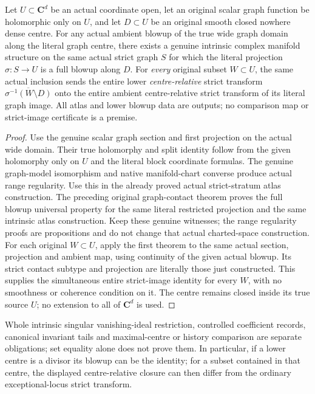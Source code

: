\begin{theorem}
\label{hir:actual-open-graph-every-subset-strict-transform}
\leanok
Let $U\subset\mathbf C^d$ be an actual coordinate open, let an original
scalar graph function be holomorphic only on $U$, and let $D\subset U$
be an original smooth closed nowhere dense centre. For any actual ambient
blowup of the true wide graph domain along the literal graph centre,
there exists a genuine intrinsic complex manifold structure on the same
actual strict graph $S$ for which the literal projection $\sigma:S\to U$
is a full blowup along $D$. For \emph{every} original subset $W\subset U$,
the same actual inclusion sends the entire lower \emph{centre-relative}
strict transform $\overline{\sigma^{-1}(W\setminus D)}$ onto the entire
ambient centre-relative strict transform of its literal graph image.
All atlas and lower blowup data are outputs; no comparison map or
strict-image certificate is a premise.
\end{theorem}
\begin{proof}
Use the genuine scalar graph section and first projection on the actual
wide domain. Their true holomorphy and split identity follow from the
given holomorphy only on $U$ and the literal block coordinate formulas.
The genuine graph-model isomorphism and native manifold-chart converse
produce actual range regularity. Use this in the already proved actual
strict-stratum atlas construction. The preceding original graph-contact
theorem proves the full blowup universal property for the same literal
restricted projection and the same intrinsic atlas construction. Keep
these genuine witnesses; the range regularity proofs are propositions
and do not change that actual charted-space construction.
For each original $W\subset U$, apply the first theorem to the same
actual section, projection and ambient map, using continuity of the
given actual blowup. Its strict contact subtype and projection are
literally those just constructed. This supplies the simultaneous entire
strict-image identity for every $W$, with no smoothness or coherence
condition on it. The centre remains closed inside its true source $U$;
no extension to all of $\mathbf C^d$ is used.
\end{proof}

Whole intrinsic singular vanishing-ideal restriction, controlled coefficient
records, canonical invariant tails and maximal-centre or history comparison
are separate obligations; set equality alone does not prove them.
In particular, if a lower centre is a divisor its blowup can be the identity;
for a subset contained in that centre, the displayed centre-relative closure
can then differ from the ordinary exceptional-locus strict transform.

